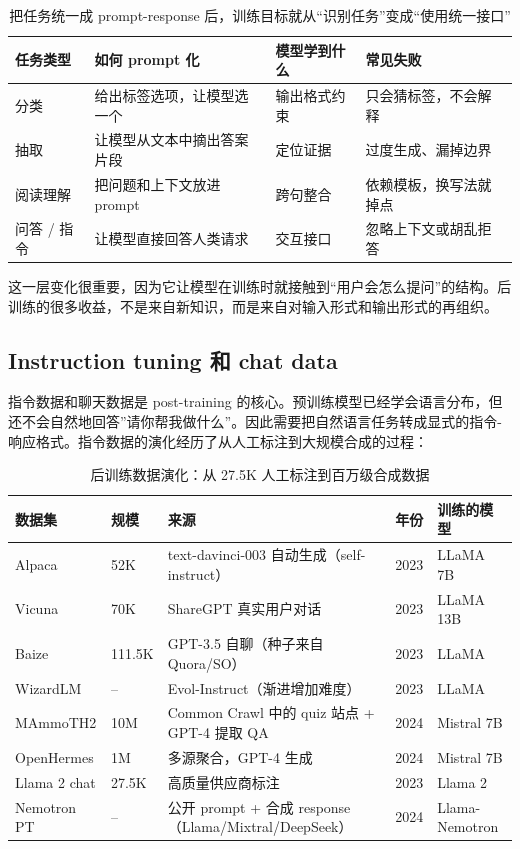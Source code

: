 \begin{table}[H]
\centering
\begin{tabular}{p{}p{}p{}p{}}
\toprule
\textbf{任务类型} & \textbf{如何 prompt 化} & \textbf{模型学到什么} & \textbf{常见失败} \\
\midrule
分类 & 给出标签选项，让模型选一个 & 输出格式约束 & 只会猜标签，不会解释 \\
抽取 & 让模型从文本中摘出答案片段 & 定位证据 & 过度生成、漏掉边界 \\
阅读理解 & 把问题和上下文放进 prompt & 跨句整合 & 依赖模板，换写法就掉点 \\
问答 / 指令 & 让模型直接回答人类请求 & 交互接口 & 忽略上下文或胡乱拒答 \\
\bottomrule
\end{tabular}
\caption{把任务统一成 prompt-response 后，训练目标就从“识别任务”变成“使用统一接口”}
\end{table}

这一层变化很重要，因为它让模型在训练时就接触到“用户会怎么提问”的结构。后训练的很多收益，不是来自新知识，而是来自对输入形式和输出形式的再组织。

\subsection{Instruction tuning 和 chat data}

指令数据和聊天数据是 post-training 的核心。预训练模型已经学会语言分布，但还不会自然地回答”请你帮我做什么”。因此需要把自然语言任务转成显式的指令-响应格式。指令数据的演化经历了从人工标注到大规模合成的过程：

\begin{table}[H]
\centering
\small
\begin{tabular}{p{}p{}p{}p{}p{}}
\toprule
\textbf{数据集} & \textbf{规模} & \textbf{来源} & \textbf{年份} & \textbf{训练的模型} \\
\midrule
Alpaca & 52K & text-davinci-003 自动生成（self-instruct） & 2023 & LLaMA 7B \\
Vicuna & 70K & ShareGPT 真实用户对话 & 2023 & LLaMA 13B \\
Baize & 111.5K & GPT-3.5 自聊（种子来自 Quora/SO） & 2023 & LLaMA \\
WizardLM & -- & Evol-Instruct（渐进增加难度） & 2023 & LLaMA \\
MAmmoTH2 & 10M & Common Crawl 中的 quiz 站点 + GPT-4 提取 QA & 2024 & Mistral 7B \\
OpenHermes & 1M & 多源聚合，GPT-4 生成 & 2024 & Mistral 7B \\
Llama 2 chat & 27.5K & 高质量供应商标注 & 2023 & Llama 2 \\
Nemotron PT & -- & 公开 prompt + 合成 response（Llama/Mixtral/DeepSeek） & 2024 & Llama-Nemotron \\
\bottomrule
\end{tabular}
\caption{后训练数据演化：从 27.5K 人工标注到百万级合成数据}
\end{table}


